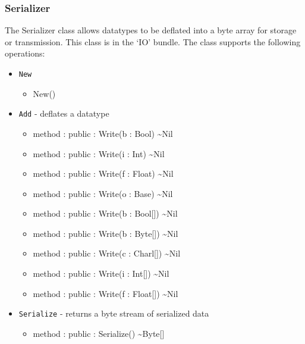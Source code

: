 \documentclass[11pt]{article}
\begin{document}
\subsubsection{Serializer}
The Serializer class allows datatypes to be deflated into a byte array
for storage or transmission.  This class is in the `IO' bundle.  The
class supports the following operations:
\begin{itemize}
\item \texttt{New}
  \begin{itemize}
  \item New()
  \end{itemize}
\item \texttt{Add} - deflates a datatype
  \begin{itemize}
  \item method : public : Write(b : Bool) \textasciitilde Nil
  \end{itemize}
  \begin{itemize}
  \item method : public : Write(i : Int) \textasciitilde Nil
  \end{itemize}
  \begin{itemize}
  \item method : public : Write(f : Float) \textasciitilde Nil
  \end{itemize}
  \begin{itemize}
  \item method : public : Write(o : Base) \textasciitilde Nil
  \end{itemize}
  \begin{itemize}
  \item method : public : Write(b : Bool[]) \textasciitilde Nil
  \end{itemize}
  \begin{itemize}
  \item method : public : Write(b : Byte[]) \textasciitilde Nil
  \end{itemize}
  \begin{itemize}
  \item method : public : Write(c : Charl[]) \textasciitilde Nil
  \end{itemize}
  \begin{itemize}
  \item method : public : Write(i : Int[]) \textasciitilde Nil
  \end{itemize}
  \begin{itemize}
  \item method : public : Write(f : Float[]) \textasciitilde Nil
  \end{itemize}
\item \texttt{Serialize} - returns a byte stream of serialized data
  \begin{itemize}
  \item method : public : Serialize() \textasciitilde Byte[]
  \end{itemize}
\end{itemize}
\end{document}
